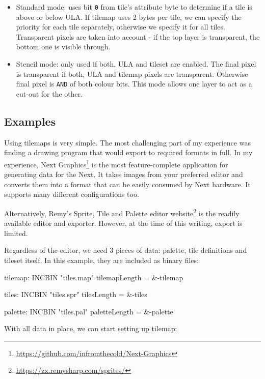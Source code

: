 \begin{itemize}[topsep=1pt,itemsep=1pt]
	\item Standard mode: uses bit {\tt 0} from tile's attribute byte to determine if a tile is above or below ULA. If tilemap uses 2 bytes per tile, we can specify the priority for each tile separately, otherwise we specify it for all tiles. Transparent pixels are taken into account - if the top layer is transparent, the bottom one is visible through.
	
	\item Stencil mode: only used if both, ULA and tileset are enabled. The final pixel is transparent if both, ULA and tilemap pixels are transparent. Otherwise final pixel is {\tt AND} of both colour bits. This mode allows one layer to act as a cut-out for the other.
\end{itemize}


\subsection{Examples}

Using tilemaps is very simple. The most challenging part of my experience was finding a drawing program that would export to required formats in full. In my experience, Next Graphics\footnote{\url{https://github.com/infromthecold/Next-Graphics}} is the most feature-complete application for generating data for the Next. It takes images from your preferred editor and converts them into a format that can be easily consumed by Next hardware. It supports many different configurations too.

Alternatively, Remy's Sprite, Tile and Palette editor website\footnote{\url{https://zx.remysharp.com/sprites/}} is the readily available editor and exporter. However, at the time of this writing, export is limited.

Regardless of the editor, we need 3 pieces of data: palette, tile definitions and tileset itself. In this example, they are included as binary files:

\begin{tcblisting}{}
tilemap:
	INCBIN "tiles.map"
tilemapLength = &-tilemap

tiles:
	INCBIN "tiles.spr"
tilesLength = &-tiles

palette:
	INCBIN "tiles.pal"
paletteLength = &-palette
\end{tcblisting}

With all data in place, we can start setting up tilemap:

